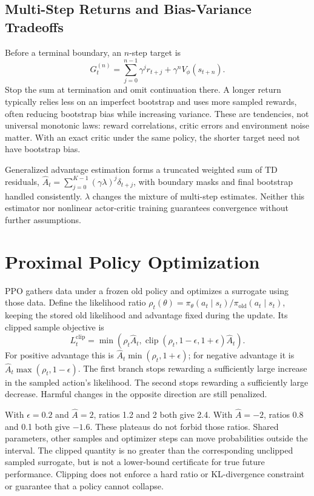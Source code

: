 \subsection{Multi-Step Returns and Bias-Variance Tradeoffs}

Before a terminal boundary, an $n$-step target is
\begin{equation}
G_t^{(n)}=\sum_{j=0}^{n-1}\gamma^jr_{t+j}
+\gamma^nV_\phi(s_{t+n}).
\end{equation}
Stop the sum at termination and omit continuation there. A longer return typically relies less on an imperfect bootstrap and uses more sampled rewards, often reducing bootstrap bias while increasing variance. These are tendencies, not universal monotonic laws: reward correlations, critic errors and environment noise matter. With an exact critic under the same policy, the shorter target need not have bootstrap bias.

Generalized advantage estimation forms a truncated weighted sum of TD residuals, $\hat A_t=\sum_{j=0}^{K-1}(\gamma\lambda)^j\delta_{t+j}$, with boundary masks and final bootstrap handled consistently. $\lambda$ changes the mixture of multi-step estimates. Neither this estimator nor nonlinear actor-critic training guarantees convergence without further assumptions.

\section{Proximal Policy Optimization}

PPO gathers data under a frozen old policy and optimizes a surrogate using those data. Define the likelihood ratio $\rho_t(\theta)=\pi_\theta(a_t\mid s_t)/\pi_{\mathrm{old}}(a_t\mid s_t)$, keeping the stored old likelihood and advantage fixed during the update. Its clipped sample objective is
\begin{equation}
L_t^{\mathrm{clip}}=\min\left(
\rho_t\hat A_t,
\operatorname{clip}(\rho_t,1-\epsilon,1+\epsilon)\hat A_t\right).
\end{equation}
For positive advantage this is $\hat A_t\min(\rho_t,1+\epsilon)$; for negative advantage it is $\hat A_t\max(\rho_t,1-\epsilon)$. The first branch stops rewarding a sufficiently large increase in the sampled action's likelihood. The second stops rewarding a sufficiently large decrease. Harmful changes in the opposite direction are still penalized.

With $\epsilon=0.2$ and $\hat A=2$, ratios 1.2 and 2 both give 2.4. With $\hat A=-2$, ratios 0.8 and 0.1 both give $-1.6$. These plateaus do not forbid those ratios. Shared parameters, other samples and optimizer steps can move probabilities outside the interval. The clipped quantity is no greater than the corresponding unclipped sampled surrogate, but is not a lower-bound certificate for true future performance. Clipping does not enforce a hard ratio or KL-divergence constraint or guarantee that a policy cannot collapse.

